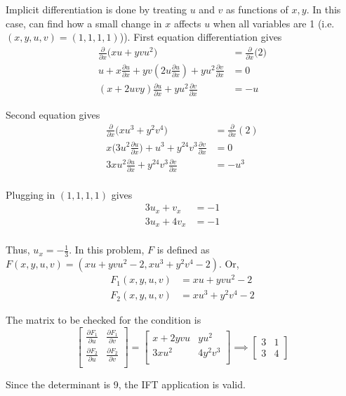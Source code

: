 Implicit differentiation is done by treating $u$ and $v$ as functions of $x,y$. In this case,
can find how a small change in $x$ affects $u$ when all variables are 1 (i.e. $(x,y,u,v)=(1,1,1,1)$)).
First equation differentiation gives 
\begin{align*}
    \frac{\partial }{\partial x}\Big(xu+yvu^2\Big)&=\frac{\partial }{\partial x}
    \Big(2\Big)\\
    u+x\frac{\partial u}{\partial x}+yv\left(2u\frac{\partial u}{\partial x}\right)+yu^2\frac{\partial v}{\partial x}&=0\\
    (x+2uvy)\frac{\partial u}{\partial x}+yu^2\frac{\partial v}{\partial x}&=-u
\end{align*}

Second equation gives 
\begin{align*}
    \frac{\partial }{\partial x}\Big(xu^3+y^2v^4\Big)&=\frac{\partial}{\partial x}(2)\\
    x\Big(3u^2\frac{\partial u}{\partial x}\Big)+u^3+y^24v^3\frac{\partial v}{\partial x}&=0\\
    3xu^2\frac{\partial u}{\partial x}+y^24v^3\frac{\partial v}{\partial x}&=-u^3\\
\end{align*}

Plugging in $(1,1,1,1)$ gives 
\begin{align*}
    3u_x+v_x&=-1\\
    3u_x+4v_x&=-1\\
\end{align*}

Thus, $u_x=-\frac{1}{3}$. In this problem, $F$ is defined as $F(x,y,u,v)=(xu+yvu^2-2,xu^3+y^2v^4-2)$. Or,
\begin{align*}
    F_1(x,y,u,v)&=xu+yvu^2-2\\
    F_2(x,y,u,v)&=xu^3+y^2v^4-2
\end{align*}

The matrix to be checked for the condition is 
\[
    \begin{bmatrix}
    \frac{\partial F_1}{\partial u}&\frac{\partial F_1}{\partial v}\\
    \frac{\partial F_2}{\partial u}&\frac{\partial F_2}{\partial v}\\
    \end{bmatrix}
    =
    \begin{bmatrix}
    x+2yvu&yu^2\\
    3xu^2&4y^2v^3\\
    \end{bmatrix}
    \implies 
    \begin{bmatrix}
        3&1\\
        3&4
    \end{bmatrix}
\]

Since the determinant is 9, the IFT application is valid.